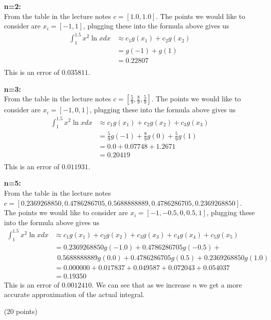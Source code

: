 \documentclass[10pt]{jhwhw}
\begin{document}
		\bigbreak
		\textbf{n=2:} \\
		From the table in the lecture notes $c = [1.0, 1.0]$.
		The points we would like to consider are $x_i = [-1, 1]$, plugging these
		into the formula above gives us
		\begin{align*}
			\int_{1}^{1.5}x^2\ln x dx &\approx
				c_1 g(x_1) + c_2 g(x_2) \\
			&= g(-1) + g(1) \\
			&= 0.22807 \\
		\end{align*}
		This is an error of $0.035811$.

		\bigbreak
		\textbf{n=3:} \\
		From the table in the lecture notes $c = [\frac{5}{9}, \frac{8}{9}, \frac{5}{9}]$.
		The points we would like to consider are $x_i = [-1, 0, 1]$, plugging these
		into the formula above gives us
		\begin{align*}
			\int_{1}^{1.5}x^2\ln x dx &\approx
				c_1 g(x_1) + c_2 g(x_2) + c_3 g(x_3) \\
			&= \frac{5}{9}g(-1) + \frac{8}{9}g(0) + \frac{5}{9}g(1)\\
			&= 0.0 + 0.07748 + 1.2671 \\
			&= 0.20419 \\
		\end{align*}
		This is an error of $0.011931$.

		\clearpage
		\textbf{n=5:} \\
		From the table in the lecture notes 
		$c = [0.2369268850, 0.4786286705, 0.5688888889, 0.4786286705, 0.2369268850]$.
		The points we would like to consider are $x_i = [-1, -0.5, 0, 0.5, 1]$, plugging these
		into the formula above gives us
		\begin{align*}
			\int_{1}^{1.5}x^2\ln x dx &\approx
				c_1 g(x_1) + c_2 g(x_2) + c_3 g(x_3) + c_4 g(x_4) + c_5 g(x_5) \\
			&= 0.2369268850g(-1.0) + 0.4786286705g(-0.5) + \\
			&\ \ 0.5688888889g(0.0) + 0.4786286705g(0.5) + 0.2369268850g(1.0) \\
			&= 0.000000 + 0.017837 + 0.049587 + 0.072043 + 0.054037 \\
			&= 0.19350
		\end{align*}
		This is an error of $0.0012410$.
		\bigbreak
		We can see that as we increase $n$ we get a more accurate approximation of the
		actual integral.

\problem{} (20 points)
\end{document}
